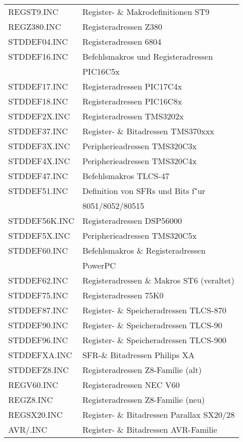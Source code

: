 \documentclass[12pt,a4paper,twoside]{report}
\begin{document}
\begin{center}
\begin{longtable}{|l|l|}
REGST9.INC        & Register- \& Makrodefinitionen ST9 \\
REGZ380.INC       & Registeradressen Z380 \\
STDDEF04.INC      & Registeradressen 6804 \\
STDDEF16.INC      & Befehlsmakros und Registeradressen \\
                  & PIC16C5x \\
STDDEF17.INC      & Registeradressen PIC17C4x \\
STDDEF18.INC      & Registeradressen PIC16C8x \\
STDDEF2X.INC      & Registeradressen TMS3202x \\
STDDEF37.INC      & Register- \& Bitadressen TMS370xxx \\
STDDEF3X.INC      & Peripherieadressen TMS320C3x \\
STDDEF4X.INC      & Peripherieadressen TMS320C4x \\
STDDEF47.INC      & Befehlsmakros TLCS-47 \\
STDDEF51.INC      & Definition von SFRs und Bits f"ur \\
                  & 8051/8052/80515 \\
STDDEF56K.INC     & Registeradressen DSP56000 \\
STDDEF5X.INC      & Peripherieadressen TMS320C5x \\
STDDEF60.INC      & Befehlsmakros \& Registeradressen \\
                  & PowerPC \\
STDDEF62.INC      & Registeradressen \& Makros ST6 (veraltet)\\
STDDEF75.INC      & Registeradressen 75K0 \\
STDDEF87.INC      & Register- \& Speicheradressen TLCS-870 \\
STDDEF90.INC      & Register- \& Speicheradressen TLCS-90 \\
STDDEF96.INC      & Register- \& Speicheradressen TLCS-900 \\
STDDEFXA.INC      & SFR-\& Bitadressen Philips XA \\
STDDEFZ8.INC      & Registeradressen Z8-Familie (alt)\\
REGV60.INC        & Registeradressen NEC V60 \\
REGZ8.INC         & Registeradressen Z8-Familie (neu)\\
REGSX20.INC       & Register- \& Bitadressen Parallax SX20/28 \\
AVR/\*.INC        & Register- \& Bitadressen AVR-Familie \\

\end{longtable}
\end{center}
\end{document}
